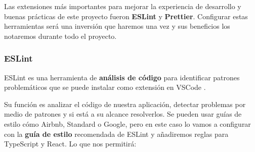 \documentclass[12pt,twoside,titlepage]{report}
\begin{document}
Las extensiones más importantes para mejorar la experiencia de desarrollo y buenas prácticas de este proyecto fueron \textbf{ESLint} y \textbf{Prettier}. Configurar estas herramientas será una inversión que haremos una vez y sus beneficios los notaremos durante todo el proyecto.

\subsubsection{ESLint}

ESLint es una herramienta de \textbf{análisis de código} para identificar patrones problemáticos que se puede instalar como extensión en VSCode \cite{eslint}.

Su función es analizar el código de nuestra aplicación, detectar problemas por medio de patrones y si está a su alcance resolverlos. Se pueden usar guías de estilo cómo Airbnb, Standard o Google, pero en este caso lo vamos a configurar con la \textbf{guía de estilo} recomendada de ESLint y añadiremos reglas para TypeScript y React. Lo que nos permitirá:
\end{document}
